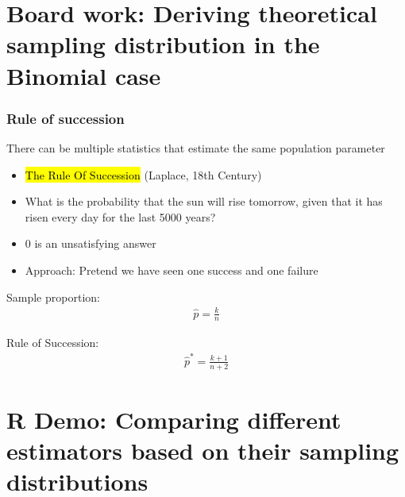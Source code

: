 \documentclass[t,compress,mathserif]{beamer}
\begin{document}
\section{Board work: Deriving theoretical sampling distribution in the Binomial case}


\begin{frame}
    \frametitle{Rule of succession}

    There can be multiple statistics that estimate the same population parameter
    \begin{itemize}

        \item \hl{The Rule Of Succession} (Laplace, 18th Century)
        \item What is the probability that the sun will rise tomorrow, given that it has risen every day for the last 5000 years?
        \item 0 is an unsatisfying answer
        \item Approach: Pretend we have seen one success and one failure
    
    \end{itemize}

    Sample proportion:
     \begin{align}
        \hat{p}=\frac{k}{n}
    \end{align}
 
    Rule of Succession:
    \begin{align}
        \hat{p}^*=\frac{k +1}{n+2}
    \end{align}
 
\end{frame}



\section{R Demo: Comparing different estimators based on their sampling distributions}

\end{document}
